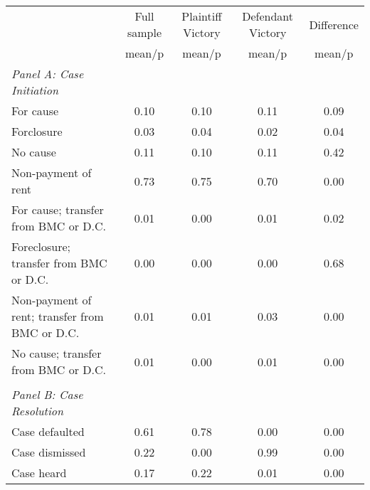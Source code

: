 {
\def\sym#1{\ifmmode^{#1}\else\(^{#1}\)\fi}
\begin{tabular}{l*{4}{c}}
\toprule
                    &\multicolumn{1}{c}{Full sample}&\multicolumn{1}{c}{Plaintiff Victory}&\multicolumn{1}{c}{Defendant Victory}&\multicolumn{1}{c}{Difference}\\
                    &      mean/p&      mean/p&      mean/p&      mean/p\\
\midrule
\emph{Panel A: Case Initiation}&            &            &            &            \\
\hspace{0.25cm}For cause&       0.10 &       0.10 &       0.11 &        0.09\\
\hspace{0.25cm}Forclosure&       0.03 &       0.04 &       0.02 &        0.04\\
\hspace{0.25cm}No cause&       0.11 &       0.10 &       0.11 &        0.42\\
\hspace{0.25cm}Non-payment of rent&       0.73 &       0.75 &       0.70 &        0.00\\
\hspace{0.25cm}For cause; transfer from BMC or D.C.&       0.01 &       0.00 &       0.01 &        0.02\\
\hspace{0.25cm}Foreclosure; transfer from BMC or D.C.&       0.00 &       0.00 &       0.00 &        0.68\\
\hspace{0.25cm}Non-payment of rent; transfer from BMC or D.C.&       0.01 &       0.01 &       0.03 &        0.00\\
\hspace{0.25cm}No cause; transfer from BMC or D.C.&       0.01 &       0.00 &       0.01 &        0.00\\
\vspace{0.1em} \\ \emph{Panel B: Case Resolution}&            &            &            &            \\
\hspace{0.25cm}Case defaulted&       0.61 &       0.78 &       0.00 &        0.00\\
\hspace{0.25cm}Case dismissed&       0.22 &       0.00 &       0.99 &        0.00\\
\hspace{0.25cm}Case heard&       0.17 &       0.22 &       0.01 &        0.00\\

\end{tabular}}
